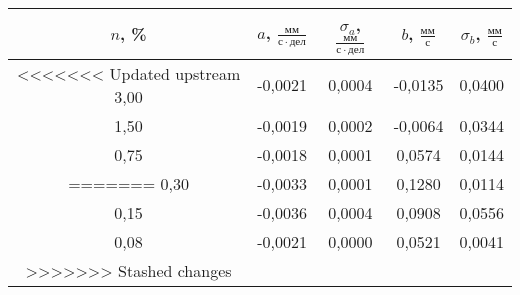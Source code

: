 \begin{tabular}[t]{|c|c|c|c|c|}
\hline
$n$, \% & $a$, $\frac{мм}{с \cdot дел}$ & $\sigma_a$, $\frac{мм}{с \cdot дел}$ & $b$, $\frac{мм}{с}$ & $\sigma_b$, $\frac{мм}{с}$ \\ 
\hline
<<<<<<< Updated upstream
3,00 & -0,0021 & 0,0004 & -0,0135 & 0,0400 \\ 
1,50 & -0,0019 & 0,0002 & -0,0064 & 0,0344 \\ 
0,75 & -0,0018 & 0,0001 & 0,0574 & 0,0144 \\ 
=======
0,30 & -0,0033 & 0,0001 & 0,1280 & 0,0114 \\ 
0,15 & -0,0036 & 0,0004 & 0,0908 & 0,0556 \\ 
0,08 & -0,0021 & 0,0000 & 0,0521 & 0,0041 \\ 
>>>>>>> Stashed changes
\hline
\end{tabular}